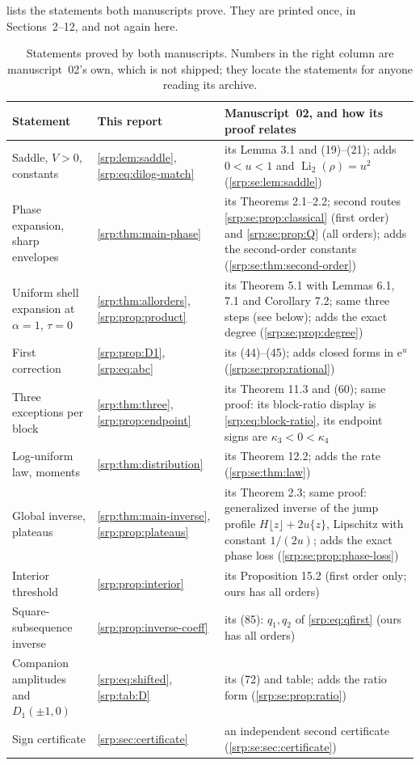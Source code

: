 \documentclass[11pt,a4paper]{article}
\numberwithin{equation}{section}
\theoremstyle{definition}
\theoremstyle{remark}
\DeclareMathOperator{\Li}{Li}
\newcommand{\e}{\mathrm e}
\begin{document}
 lists the statements both manuscripts prove. They
are printed once, in Sections~2--12, and not again here.

\begin{table}[htbp]
\centering\small
\begin{tabularx}{\textwidth}{@{}>{\raggedright\arraybackslash}p{}
 >{\raggedright\arraybackslash}p{}>{\raggedright\arraybackslash}X@{}}
\toprule
Statement & This report & Manuscript~02, and how its proof relates\\
\midrule
Saddle, $V>0$, constants &
\cref{srp:lem:saddle}, \eqref{srp:eq:dilog-match} &
its Lemma 3.1 and (19)--(21); adds $0<u<1$ and $\Li_2(\rho)=u^2$
(\cref{srp:se:lem:saddle})\\
Phase expansion, sharp envelopes &
\cref{srp:thm:main-phase} &
its Theorems 2.1--2.2; second routes \cref{srp:se:prop:classical}
(first order) and \cref{srp:se:prop:Q} (all orders); adds the
second-order constants (\cref{srp:se:thm:second-order})\\
Uniform shell expansion at $\alpha=1$, $\tau=0$ &
\cref{srp:thm:allorders}, \cref{srp:prop:product} &
its Theorem 5.1 with Lemmas 6.1, 7.1 and Corollary 7.2; same three steps
(see below); adds the exact degree (\cref{srp:se:prop:degree})\\
First correction &
\cref{srp:prop:D1}, \eqref{srp:eq:abc} &
its (44)--(45); adds closed forms in $\e^u$
(\cref{srp:se:prop:rational})\\
Three exceptions per block &
\cref{srp:thm:three}, \cref{srp:prop:endpoint} &
its Theorem 11.3 and (60); same proof: its block-ratio display is
\eqref{srp:eq:block-ratio}, its endpoint signs are
$\kappa_3<0<\kappa_4$\\
Log-uniform law, moments &
\cref{srp:thm:distribution} &
its Theorem 12.2; adds the rate (\cref{srp:se:thm:law})\\
Global inverse, plateaus &
\cref{srp:thm:main-inverse}, \cref{srp:prop:plateaus} &
its Theorem 2.3; same proof: generalized inverse of the jump profile
$H\lfloor z\rfloor+2u\{z\}$, Lipschitz with constant $1/(2u)$; adds the
exact phase loss (\cref{srp:se:prop:phase-loss})\\
Interior threshold &
\cref{srp:prop:interior} &
its Proposition 15.2 (first order only; ours has all orders)\\
Square-subsequence inverse &
\cref{srp:prop:inverse-coeff} &
its (85): $q_1,q_2$ of \eqref{srp:eq:qfirst} (ours has all orders)\\
Companion amplitudes and $D_1(\pm1,0)$ &
\eqref{srp:eq:shifted}, \cref{srp:tab:D} &
its (72) and table; adds the ratio form (\cref{srp:se:prop:ratio})\\
Sign certificate &
\cref{srp:sec:certificate} &
an independent second certificate (\cref{srp:se:sec:certificate})\\
\bottomrule
\end{tabularx}
\caption{Statements proved by both manuscripts. Numbers in the right
column are manuscript~02's own, which is not shipped; they locate the
statements for anyone reading its archive.}
\label{srp:se:tab:shared}
\end{table}
\end{document}
